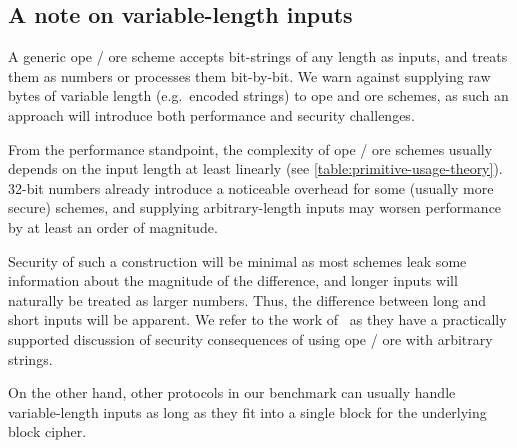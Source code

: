 	\subsection{A note on variable-length inputs}\label{section:range-snapshot:variable-inputs}

		A generic \acrshort{ope} / \acrshort{ore} scheme accepts bit-strings of any length as inputs, and treats them as numbers or processes them bit-by-bit.
		We warn against supplying raw bytes of variable length (e.g.\ encoded strings) to \acrshort{ope} and \acrshort{ore} schemes, as such an approach will introduce both performance and security challenges.

		From the performance standpoint, the complexity of \acrshort{ope} / \acrshort{ore} schemes usually depends on the input length at least linearly (see \cref{table:primitive-usage-theory}).
		32-bit numbers already introduce a noticeable overhead for some (usually more secure) schemes, and supplying arbitrary-length inputs may worsen performance by at least an order of magnitude.

		Security of such a construction will be minimal as most schemes leak some information about the magnitude of the difference, and longer inputs will naturally be treated as larger numbers.
		Thus, the difference between long and short inputs will be apparent.
		We refer to the work of~\textcite{leakage-abuse-grubs-2017} as they have a practically supported discussion of security consequences of using \acrshort{ope} / \acrshort{ore} with arbitrary strings.

		On the other hand, other protocols in our benchmark can usually handle variable-length inputs as long as they fit into a single block for the underlying block cipher.
